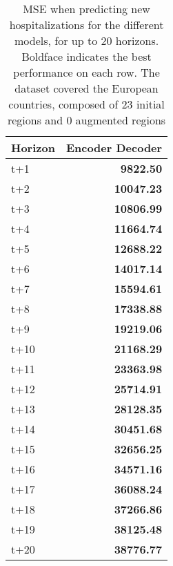 \begin{table}[H]
\centering
\caption{MSE when predicting new hospitalizations for the different models, for up to 20 horizons. Boldface indicates the best performance on each row. The dataset covered the European countries, composed of 23 initial regions and 0 augmented regions }
\label{tab:MSE_comparison}
\begin{tabular}{lr}
\toprule
Horizon &  Encoder Decoder \\
\midrule
t+1  & \textbf{9822.50}  \\
t+2  & \textbf{10047.23}  \\
t+3  & \textbf{10806.99}  \\
t+4  & \textbf{11664.74}  \\
t+5  & \textbf{12688.22}  \\
t+6  & \textbf{14017.14}  \\
t+7  & \textbf{15594.61}  \\
t+8  & \textbf{17338.88}  \\
t+9  & \textbf{19219.06}  \\
t+10  & \textbf{21168.29}  \\
t+11  & \textbf{23363.98}  \\
t+12  & \textbf{25714.91}  \\
t+13  & \textbf{28128.35}  \\
t+14  & \textbf{30451.68}  \\
t+15  & \textbf{32656.25}  \\
t+16  & \textbf{34571.16}  \\
t+17  & \textbf{36088.24}  \\
t+18  & \textbf{37266.86}  \\
t+19  & \textbf{38125.48}  \\
t+20  & \textbf{38776.77}  \\

\bottomrule
\end{tabular}
\end{table}
